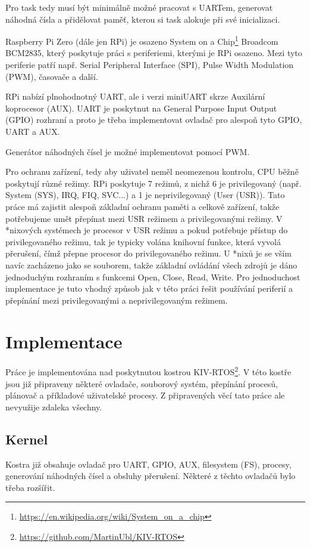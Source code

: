 \documentclass[12pt, letterpaper]{article}
\begin{document}
Pro task tedy musí být minimálně možné pracovat s UARTem, generovat náhodná čísla a přidělovat paměť, kterou si task 
alokuje při své inicializaci.

Raspberry Pi Zero (dále jen RPi) je osazeno System on a 
Chip\footnote{\url{https://en.wikipedia.org/wiki/System_on_a_chip}} Broadcom BCM2835, který poskytuje 
práci s periferiemi, kterými je RPi osazeno. Mezi tyto periferie patří např. Serial Peripheral Interface (SPI), Pulse
Width Modulation (PWM), časovače a další.

RPi nabízí plnohodnotný UART, ale i verzi miniUART skrze Auxilární koprocesor (AUX). UART je poskytnut na General 
Purpose Input Output (GPIO) rozhraní a proto je třeba implementovat ovladač pro alespoň tyto GPIO, UART a AUX.

Generátor náhodných čísel je možné implementovat pomocí PWM.

Pro ochranu zařízení, tedy aby uživatel neměl neomezenou kontrolu, CPU běžně poskytují různé režimy. RPi poskytuje
7 režimů, z nichž 6 je privilegovaný (např. System (SYS), IRQ, FIQ, SVC...) a 1 je neprivilegovaný (User (USR)).
Tato práce má zajistit alespoň základní ochranu paměti a celkově zařízení, takže potřebujeme umět přepínat mezi USR režimem a 
privilegovanými režimy. V *nixových systémech je procesor v USR režimu a pokud potřebuje přístup do privilegovaného
režimu, tak je typicky volána knihovní funkce, která vyvolá přerušení, čímž přepne procesor do privilegovaného
režimu. U *nixů je se vším navíc zacházeno jako se souborem, takže základní ovládání všech zdrojů je dáno jednoduchým
rozhraním s funkcemi Open, Close, Read, Write. Pro jednoduchost implementace je tuto vhodný způsob jak v této práci
řešit používání periferií a přepínání mezi privilegovanými a neprivilegovaným režimem.
%
\section{Implementace}
Práce je implementována nad poskytnutou kostrou KIV-RTOS\footnote{\url{https://github.com/MartinUbl/KIV-RTOS}}. 
V této kostře jsou již připraveny 
některé ovladače, souborový systém, přepínání procesů, plánovač a příkladové uživatelské procesy. Z připravených
věcí tato práce ale nevyužije zdaleka všechny. 
%
\subsection{Kernel}
Kostra již obsahuje ovladač pro UART, GPIO, AUX, filesystem (FS), procesy, generování náhodných čísel a obsluhy
přerušení. Některé z těchto ovladačů bylo třeba rozšířit.
\end{document}
